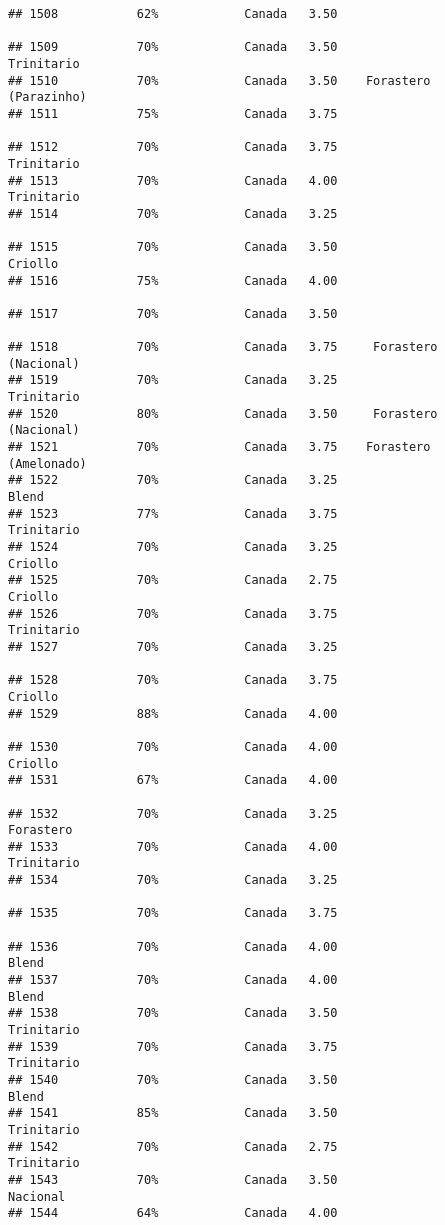 \documentclass[
]{article}
\begin{document}
\begin{verbatim}
## 1508           62%            Canada   3.50                         
## 1509           70%            Canada   3.50               Trinitario
## 1510           70%            Canada   3.50    Forastero (Parazinho)
## 1511           75%            Canada   3.75                         
## 1512           70%            Canada   3.75               Trinitario
## 1513           70%            Canada   4.00               Trinitario
## 1514           70%            Canada   3.25                         
## 1515           70%            Canada   3.50                  Criollo
## 1516           75%            Canada   4.00                         
## 1517           70%            Canada   3.50                         
## 1518           70%            Canada   3.75     Forastero (Nacional)
## 1519           70%            Canada   3.25               Trinitario
## 1520           80%            Canada   3.50     Forastero (Nacional)
## 1521           70%            Canada   3.75    Forastero (Amelonado)
## 1522           70%            Canada   3.25                    Blend
## 1523           77%            Canada   3.75               Trinitario
## 1524           70%            Canada   3.25                  Criollo
## 1525           70%            Canada   2.75                  Criollo
## 1526           70%            Canada   3.75               Trinitario
## 1527           70%            Canada   3.25                         
## 1528           70%            Canada   3.75                  Criollo
## 1529           88%            Canada   4.00                         
## 1530           70%            Canada   4.00                  Criollo
## 1531           67%            Canada   4.00                         
## 1532           70%            Canada   3.25                Forastero
## 1533           70%            Canada   4.00               Trinitario
## 1534           70%            Canada   3.25                         
## 1535           70%            Canada   3.75                         
## 1536           70%            Canada   4.00                    Blend
## 1537           70%            Canada   4.00                    Blend
## 1538           70%            Canada   3.50               Trinitario
## 1539           70%            Canada   3.75               Trinitario
## 1540           70%            Canada   3.50                    Blend
## 1541           85%            Canada   3.50               Trinitario
## 1542           70%            Canada   2.75               Trinitario
## 1543           70%            Canada   3.50                 Nacional
## 1544           64%            Canada   4.00                         

\end{verbatim}
\end{document}
